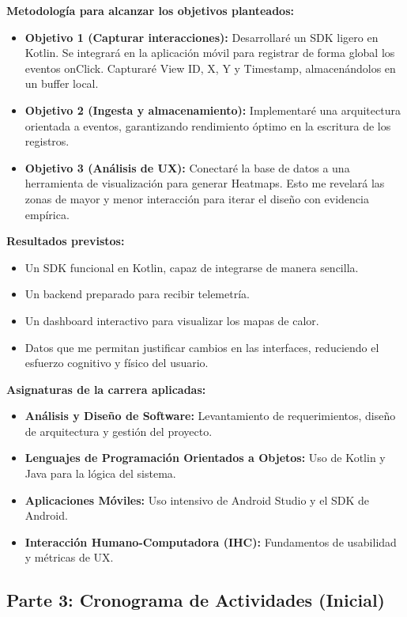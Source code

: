 \documentclass[final,3p,times]{elsarticle}
\begin{document}
\textbf{Metodología para alcanzar los objetivos planteados:}
\begin{itemize}
    \item \textbf{Objetivo 1 (Capturar interacciones):} Desarrollaré un SDK ligero en Kotlin. Se integrará en la aplicación móvil para registrar de forma global los eventos onClick. Capturaré View ID, X, Y y Timestamp, almacenándolos en un buffer local.
    \item \textbf{Objetivo 2 (Ingesta y almacenamiento):} Implementaré una arquitectura orientada a eventos, garantizando rendimiento óptimo en la escritura de los registros.
    \item \textbf{Objetivo 3 (Análisis de UX):} Conectaré la base de datos a una herramienta de visualización para generar Heatmaps. Esto me revelará las zonas de mayor y menor interacción para iterar el diseño con evidencia empírica.
\end{itemize}

\textbf{Resultados previstos:}
\begin{itemize}
    \item Un SDK funcional en Kotlin, capaz de integrarse de manera sencilla.
    \item Un backend preparado para recibir telemetría.
    \item Un dashboard interactivo para visualizar los mapas de calor.
    \item Datos que me permitan justificar cambios en las interfaces, reduciendo el esfuerzo cognitivo y físico del usuario.
\end{itemize}

\textbf{Asignaturas de la carrera aplicadas:}
\begin{itemize}
    \item \textbf{Análisis y Diseño de Software:} Levantamiento de requerimientos, diseño de arquitectura y gestión del proyecto.
    \item \textbf{Lenguajes de Programación Orientados a Objetos:} Uso de Kotlin y Java para la lógica del sistema.
    \item \textbf{Aplicaciones Móviles:} Uso intensivo de Android Studio y el SDK de Android.
    \item \textbf{Interacción Humano-Computadora (IHC):} Fundamentos de usabilidad y métricas de UX.
\end{itemize}

\subsection{Parte 3: Cronograma de Actividades (Inicial)}
\end{document}
